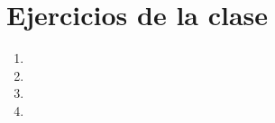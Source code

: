 \documentclass[12pt]{article}
\theoremstyle{definition}
\theoremstyle{remark}
\begin{document}

\section*{Ejercicios de la clase}
\begin{enumerate}
    \item 
    \item 
    \item 
    \item 

\end{enumerate}
\end{document}
